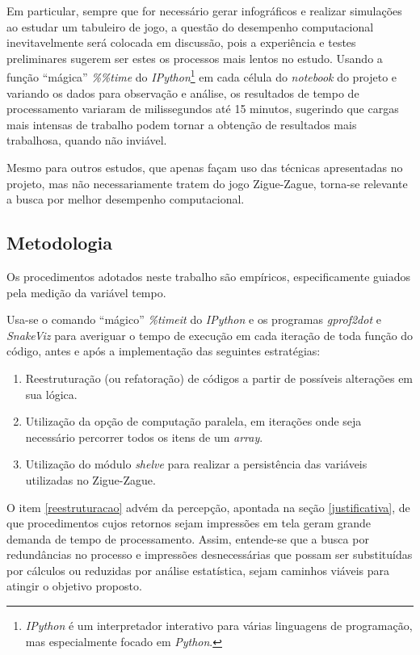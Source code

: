 \documentclass[12pt]{article}
\newcommand{\aspas}[1]{``#1''} %
\begin{document}
Em particular, sempre que for necessário gerar infográficos e realizar simulações ao estudar um tabuleiro de jogo, a questão do desempenho computacional inevitavelmente será colocada em discussão, pois a experiência e testes preliminares sugerem ser estes os processos mais lentos no estudo. Usando a função \aspas{mágica} \textit{\%\%time} do \textit{IPython}\footnote{\textit{IPython} é um interpretador interativo para várias linguagens de programação, mas especialmente focado em \textit{Python}.} em cada célula do \textit{notebook} do projeto e variando os dados para observação e análise, os resultados de tempo de processamento variaram de milissegundos até 15 minutos, sugerindo que cargas mais intensas de trabalho podem tornar a obtenção de resultados mais trabalhosa, quando não inviável. 

Mesmo para outros estudos, que apenas façam uso das técnicas apresentadas no projeto, mas não necessariamente tratem do jogo Zigue-Zague, torna-se relevante a busca por melhor desempenho computacional.

\subsection{Metodologia}
\label{metodologia}

Os procedimentos adotados neste trabalho são empíricos, especificamente guiados pela medição da variável tempo.

Usa-se o comando \aspas{mágico} \textit{\%timeit} do \textit{IPython} e os programas \textit{gprof2dot} e \textit{SnakeViz} para averiguar o tempo de execução em cada iteração de toda função do código, antes e após a implementação das seguintes estratégias:

\begin{enumerate}
	\item \label{reestruturacao} Reestruturação (ou refatoração) de códigos a partir de possíveis alterações em sua lógica.
	
	\item \label{paralela} Utilização da opção de computação paralela, em iterações onde seja necessário percorrer todos os itens de um \textit{array}.
	
	\item \label{persistencia} Utilização do módulo \textit{shelve} para realizar a persistência das variáveis utilizadas no Zigue-Zague.
\end{enumerate}

O item \ref{reestruturacao} advém da percepção, apontada na seção \ref{justificativa}, de que procedimentos cujos retornos sejam impressões em tela geram grande demanda de tempo de processamento. Assim, entende-se que a busca por redundâncias no processo e impressões desnecessárias que possam ser substituídas por cálculos ou reduzidas por análise estatística, sejam caminhos viáveis para atingir o objetivo proposto.
\end{document}
